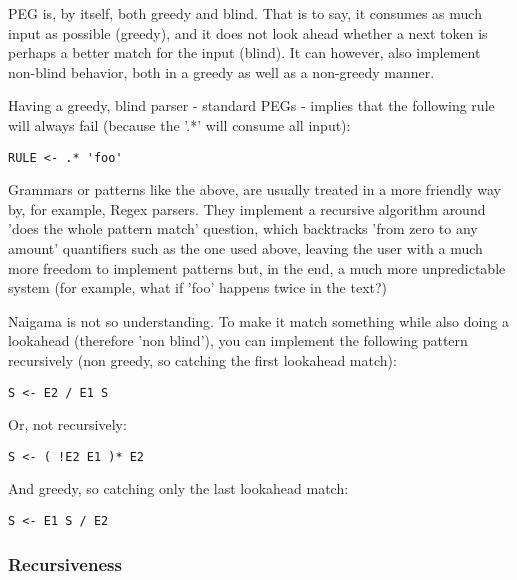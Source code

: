 PEG is, by itself, both greedy and blind.
That is to say, it consumes as much input as possible (greedy), and it does not
look ahead whether a next token is perhaps a better match for the input (blind).
It can however, also implement non-blind behavior, both in a greedy as
well as a non-greedy manner.

Having a greedy, blind parser - standard PEGs - implies that the following
rule will always fail (because the '.*' will consume all input):

\begin{myquote}
\begin{verbatim}
RULE <- .* 'foo'
\end{verbatim}
\end{myquote}

Grammars or patterns like the above, are usually treated in a more
friendly way by, for example, Regex parsers. They implement
a recursive algorithm around 'does the whole pattern match' question,
which backtracks 'from zero to any amount' quantifiers such as the one
used above,
leaving the user with a much more freedom to implement patterns but,
in the end, a much more unpredictable system (for example, what if
'foo' happens twice in the text?)

Naigama is not so understanding. To make it match something while
also doing a lookahead (therefore 'non blind'),
you can implement the following pattern
recursively (non greedy, so catching the first lookahead match):

\begin{myquote}
\begin{verbatim}
S <- E2 / E1 S
\end{verbatim}
\end{myquote}

Or, not recursively:

\begin{myquote}
\begin{verbatim}
S <- ( !E2 E1 )* E2
\end{verbatim}
\end{myquote}

And greedy, so catching only the last lookahead match:

\begin{myquote}
\begin{verbatim}
S <- E1 S / E2
\end{verbatim}
\end{myquote}

\subsubsection{Recursiveness}

